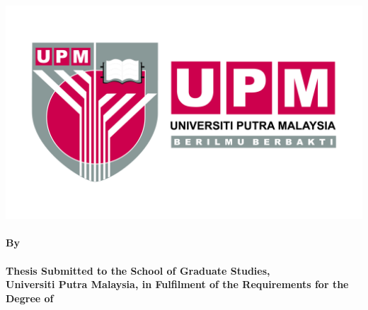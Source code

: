 \begin{center}
    \includegraphics[width=0.5\linewidth]{upm-logo.jpg} \\ \vspace{1cm}
    \textbf{\MakeUppercase{\infothesistitle}} \\ \vfill
    \textbf{By} \\ \vspace{1cm}
    \textbf{\MakeUppercase{\infostudentname}} \\ \vspace{6cm}
    \textbf{Thesis Submitted to the School of Graduate Studies, \\Universiti Putra Malaysia, in Fulfilment of the Requirements for the Degree of \infodegreename} \\ \vspace{2cm}
    \textbf{{\infovivayear} {\infovivamonth}}
\end{center}